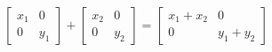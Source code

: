 \documentclass[preview]{standalone}
\begin{document}
\begin{center}
$\begin{bmatrix} x_1 & 0 \\ 0 & y_1 \end{bmatrix} + \begin{bmatrix} x_2 & 0 \\ 0 & y_2 \end{bmatrix} = \begin{bmatrix} x_1 + x_2 & 0 \\ 0 & y_1 + y_2 \end{bmatrix}$
\end{center}
\end{document}
